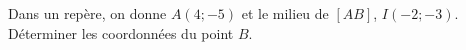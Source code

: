 
Dans un repère, on donne $A(4;-5)$ et le milieu de $[AB]$, $I(-2;-3)$. Déterminer les coordonnées du point $B$.
